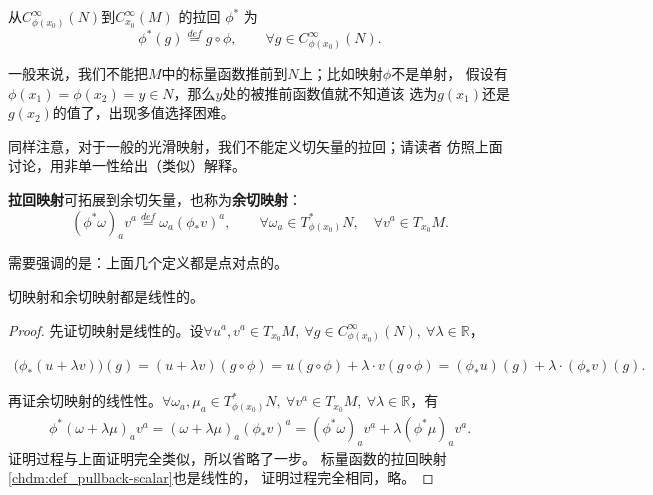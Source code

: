 \begin{definition}\label{chdm:def_pullback-scalar}
    从$C^\infty_{\phi(x_0)}(N)$到$C^\infty_{x_0}(M)$
    的拉回 $\phi^{*}$ 为
    \begin{equation}
        \phi^{*}(g) \overset{def}{=} g \circ \phi, 
        \qquad \forall g\in C^\infty_{\phi(x_0)}(N) .
    \end{equation}
\end{definition}
一般来说，我们不能把$M$中的标量函数推前到$N$上；比如映射$\phi$不是单射，
假设有$\phi(x_1)=\phi(x_2)=y\in N$，那么$y$处的被推前函数值就不知道该
选为$g(x_1)$还是$g(x_2)$的值了，出现多值选择困难。





同样注意，对于一般的光滑映射，我们不能定义切矢量的拉回；请读者
仿照上面讨论，用非单一性给出（类似）解释。

\begin{definition}\label{chdm:def_pullback-1form}
    \textbf{拉回映射}可拓展到余切矢量，也称为\textbf{余切映射}：
    \begin{equation}
        (\phi^{*}\omega)_a v^a \overset{def}{=} \omega_a (\phi_{*}v)^a ,
        \qquad \forall \omega_a \in T^{*}_{\phi(x_0)}N,\quad \forall v^a \in T_{x_0}M .
    \end{equation}
\end{definition}
需要强调的是：上面几个定义都是点对点的。


\begin{proposition}
    切映射和余切映射都是线性的。
\end{proposition}
\begin{proof}
    先证切映射是线性的。设$\forall u^a,v^a \in T_{x_0}M,\  \forall g\in C^\infty_{\phi(x_0)}(N),\ 
    \forall \lambda \in \mathbb{R}$，

    \begin{align*}
        \bigl(\phi_{*}(u+ \lambda v) \bigr)(g)= (u+ \lambda v)(g\circ \phi)
        =u(g\circ \phi) +\lambda \cdot v (g\circ \phi)
        =(\phi_{*} u) (g) + \lambda \cdot (\phi_{*}v)(g) .
    \end{align*}
    
    再证余切映射的线性性。$\forall \omega_a ,\mu_a \in T^{*}_{\phi(x_0)}N,\ 
    \forall v^a\in T_{x_0}M, \ \forall \lambda \in \mathbb{R}$，有
    \begin{align*}
         \phi^{*} (\omega+\lambda \mu )_a v^a  = 
        (\omega+\lambda \mu )_a (\phi_{*}v)^a 
        =(\phi^{*}\omega)_a v^a + \lambda(\phi^{*}\mu)_a v^a .
    \end{align*}
    证明过程与上面证明完全类似，所以省略了一步。
    标量函数的拉回映射\ref{chdm:def_pullback-scalar}也是线性的，
    证明过程完全相同，略。
\end{proof}

